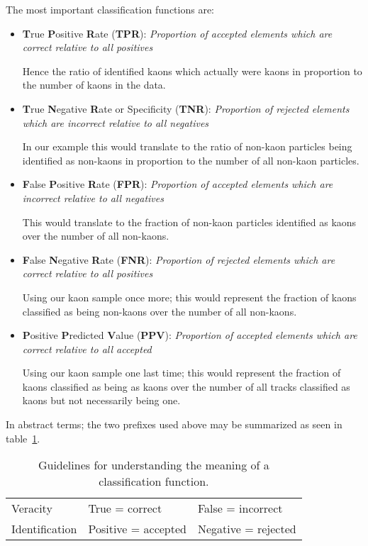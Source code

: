 The most important classification functions are:
\begin{itemize}
    \item \textbf{T}rue \textbf{P}ositive \textbf{R}ate (\textbf{TPR}): \textit{Proportion of accepted elements which are correct relative to all positives}

    \nobreak
    Hence the ratio of identified kaons which actually were kaons in proportion to the number of kaons in the data.

    \item \textbf{T}rue \textbf{N}egative \textbf{R}ate or Specificity (\textbf{TNR}): \textit{Proportion of rejected elements which are incorrect relative to all negatives}

    \nobreak
    In our example this would translate to the ratio of non-kaon particles being identified as non-kaons in proportion to the number of all non-kaon particles.

    \item \textbf{F}alse \textbf{P}ositive \textbf{R}ate (\textbf{FPR}): \textit{Proportion of accepted elements which are incorrect relative to all negatives}

    \nobreak
    This would translate to the fraction of non-kaon particles identified as kaons over the number of all non-kaons.

    \item \textbf{F}alse \textbf{N}egative \textbf{R}ate (\textbf{FNR}): \textit{Proportion of rejected elements which are correct relative to all positives}

    \nobreak
    Using our kaon sample once more; this would represent the fraction of kaons classified as being non-kaons over the number of all non-kaons.

    \item \textbf{P}ositive \textbf{P}redicted \textbf{V}alue (\textbf{PPV}): \textit{Proportion of accepted elements which are correct relative to all accepted}

    \nobreak
    Using our kaon sample one last time; this would represent the fraction of kaons classified as being as kaons over the number of all tracks classified as kaons but not necessarily being one.

\end{itemize}

In abstract terms; the two prefixes used above may be summarized as seen in table~\ref{tab:classification_guidelines}.

\vspace{2em}
\begin{table}[ht]
    \centering
    \begin{tabular}{l|ll}
        Veracity & True = correct & False = incorrect \\
        Identification & Positive = accepted & Negative = rejected
    \end{tabular}
    \caption{Guidelines for understanding the meaning of a classification function.}
    \label{tab:classification_guidelines}
\end{table}

